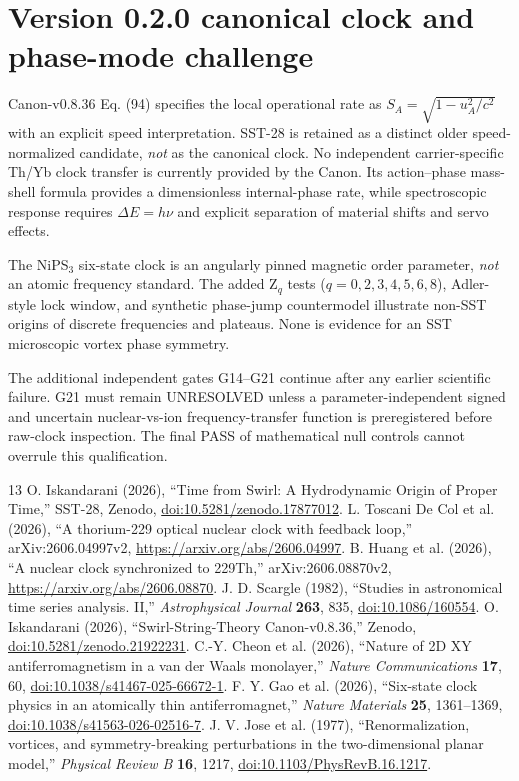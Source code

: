 \documentclass[11pt,a4paper]{article}
\begin{document}
\section{Version 0.2.0 canonical clock and phase-mode challenge}
Canon-v0.8.36 Eq. (94) specifies the local operational rate as $S_A=\sqrt{1-u_A^2/c^2}$ with an explicit speed interpretation. SST-28 is retained as a distinct older speed-normalized candidate, \emph{not} as the canonical clock. No independent carrier-specific Th/Yb clock transfer is currently provided by the Canon. Its action--phase mass-shell formula provides a dimensionless internal-phase rate, while spectroscopic response requires $\Delta E=h\nu$ and explicit separation of material shifts and servo effects.

The NiPS$_3$ six-state clock is an angularly pinned magnetic order parameter, \emph{not} an atomic frequency standard. The added Z$_q$ tests ($q=0,2,3,4,5,6,8$), Adler-style lock window, and synthetic phase-jump countermodel illustrate non-SST origins of discrete frequencies and plateaus. None is evidence for an SST microscopic vortex phase symmetry.

The additional independent gates G14--G21 continue after any earlier scientific failure. G21 must remain UNRESOLVED unless a parameter-independent signed and uncertain nuclear-vs-ion frequency-transfer function is preregistered before raw-clock inspection. The final PASS of mathematical null controls cannot overrule this qualification.

\begin{thebibliography}{13}
 O. Iskandarani (2026), ``Time from Swirl: A Hydrodynamic Origin of Proper Time,'' SST-28, Zenodo, \href{https://doi.org/10.5281/zenodo.17877012}{doi:10.5281/zenodo.17877012}.
 L. Toscani De Col et al. (2026), ``A thorium-229 optical nuclear clock with feedback loop,'' arXiv:2606.04997v2, \url{https://arxiv.org/abs/2606.04997}.
 B. Huang et al. (2026), ``A nuclear clock synchronized to 229Th,'' arXiv:2606.08870v2, \url{https://arxiv.org/abs/2606.08870}.
 J. D. Scargle (1982), ``Studies in astronomical time series analysis. II,'' \emph{Astrophysical Journal} \textbf{263}, 835, \href{https://doi.org/10.1086/160554}{doi:10.1086/160554}.
 O. Iskandarani (2026), ``Swirl-String-Theory Canon-v0.8.36,'' Zenodo, \href{https://doi.org/10.5281/zenodo.21922231}{doi:10.5281/zenodo.21922231}.
 C.-Y. Cheon et al. (2026), ``Nature of 2D XY antiferromagnetism in a van der Waals monolayer,'' \emph{Nature Communications} \textbf{17}, 60, \href{https://doi.org/10.1038/s41467-025-66672-1}{doi:10.1038/s41467-025-66672-1}.
 F. Y. Gao et al. (2026), ``Six-state clock physics in an atomically thin antiferromagnet,'' \emph{Nature Materials} \textbf{25}, 1361--1369, \href{https://doi.org/10.1038/s41563-026-02516-7}{doi:10.1038/s41563-026-02516-7}.
 J. V. Jose et al. (1977), ``Renormalization, vortices, and symmetry-breaking perturbations in the two-dimensional planar model,'' \emph{Physical Review B} \textbf{16}, 1217, \href{https://doi.org/10.1103/PhysRevB.16.1217}{doi:10.1103/PhysRevB.16.1217}.
\end{thebibliography}
\end{document}

